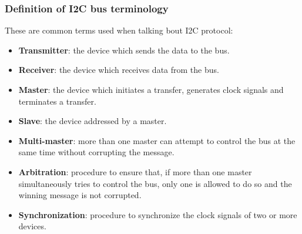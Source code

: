 \documentclass[
a4paper, %
11pt, %
onecolumn, %
openany, %
]{memoir}
\begin{document}
\subsubsection{Definition of I2C bus terminology}
These are common terms used when talking bout I2C protocol:

\begin{itemize}
	\item	\textbf{Transmitter}: the device which sends the data to the bus.
	\item	\textbf{Receiver}: the device which receives data from the bus.
	\item	\textbf{Master}: the device which initiates a transfer, generates clock signals and terminates a transfer.
	\item	\textbf{Slave}: the device addressed by a master.
	\item	\textbf{Multi-master}: more than one master can attempt to control the bus at the same time without corrupting the message.
	\item	\textbf{Arbitration}: procedure to ensure that, if more than one master simultaneously tries to control the bus, only one is allowed to do so and the winning message is not corrupted.
	\item	\textbf{Synchronization}: procedure to synchronize the clock signals of two or more devices.
\end{itemize}

\mainmatter










% 
% 
\end{document}

